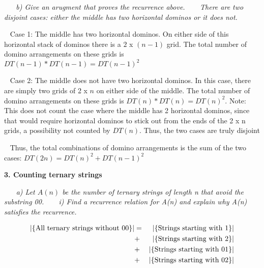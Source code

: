 \documentclass[12pt, letterpaper]{article}
\begin{document}
\-\ \newline
\-\ \newline
\it{ b) Give an arugment that proves the recurrence above. }
\-\ \newline
\-\ \newline
\textnormal{There are two disjoint cases: either the middle has two horizontal dominos or it does not.}

\-\ \newline
\textnormal{Case 1: The middle has two horizontal dominos. On either side of this horizontal stack of dominos there is a \(2\) x \((n - 1)\) grid. The total number of domino arrangements on these grids is \(DT(n - 1) * DT(n - 1) = DT(n-1)^2 \)}

\-\ \newline
\textnormal{ Case 2: The middle does not have two horizontal dominos. In this case, there are simply two grids of 2 x \(n\) on either side of the middle. The total number of domino arrangements on these grids is \(DT(n) * DT(n) = DT(n)^2  \).  }
\textnormal{ Note: This does not count the case where the middle has 2 horizontal dominos, since that would require horizontal dominos to stick out from the ends of the 2 x n grids, a possibility not counted by \(DT(n)\). Thus, the two cases are truly disjoint }

\-\ \newline
\textnormal{ Thus, the total combinations of domino arrangements is the sum of the two cases: \( DT(2n) = DT(n)^2 + DT(n - 1)^2\) }



\newpage
\bf{ 3. Counting ternary strings}

\-\ \newline
\-\ \it{ a) Let \(A(n)\) be the number of ternary strings of length n that avoid the substring 00. }
\-\ \newline
\-\ \it{ i) Find a recurrence relation for A(n) and explain why A(n) satisfies the recurrence. }
\-\ \newline

\begin{eqnarray*}
|\{\textnormal{All ternary strings without 00}\}| &=& |\{ \textnormal{Strings starting with 1} \}| \\
&+& |\{ \textnormal{Strings starting with 2} \}| \\
&+& |\{ \textnormal{Strings starting with 01} \}| \\
&+& |\{ \textnormal{Strings starting with 02} \}| \\
\end{eqnarray*}
\end{document}
